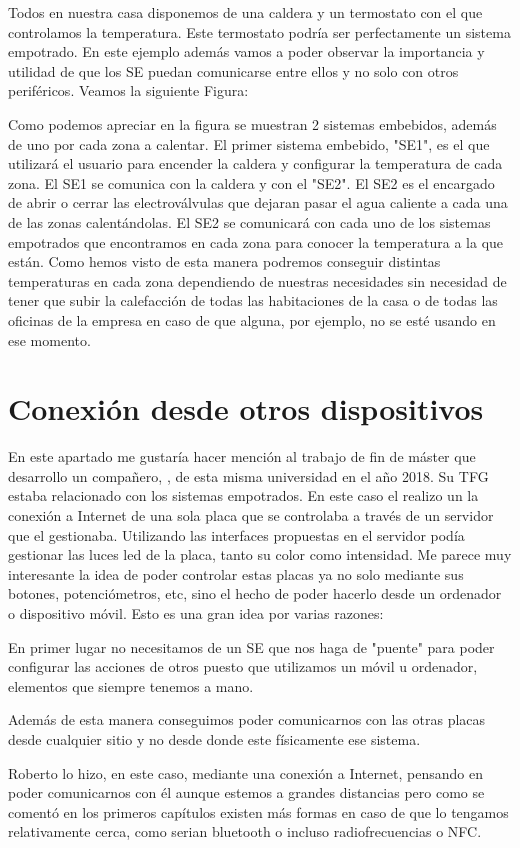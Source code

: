 Todos en nuestra casa disponemos de una caldera y un termostato con el que controlamos la temperatura. Este termostato podría ser perfectamente un sistema empotrado. En este ejemplo además vamos a poder observar la importancia y utilidad de que los SE puedan comunicarse entre ellos y no solo con otros periféricos. Veamos la siguiente Figura:


Como podemos apreciar en la figura se muestran 2 sistemas embebidos, además de uno por cada zona a calentar. El primer sistema embebido, "SE1", es el que utilizará el usuario para encender la caldera y configurar la temperatura de cada zona. El SE1 se comunica con la caldera y con el "SE2". El SE2 es el encargado de abrir o cerrar las electroválvulas que dejaran pasar el agua caliente a cada una de las zonas calentándolas. El SE2 se comunicará con cada uno de los sistemas empotrados que encontramos en cada zona para conocer la temperatura a la que están. 
Como hemos visto de esta manera podremos conseguir distintas temperaturas en cada zona dependiendo de nuestras necesidades sin necesidad de tener que subir la calefacción de todas las habitaciones de la casa o de todas las oficinas de la empresa en caso de que alguna, por ejemplo, no se esté usando en ese momento.

\section{Conexión desde otros dispositivos}\label{sec:TRConexiones}
En este apartado me gustaría hacer mención al trabajo de fin de máster que desarrollo un compañero, \cite{RPC0027}
, de esta misma universidad en el año 2018. Su TFG estaba relacionado con los sistemas empotrados. En este caso el realizo un la conexión a Internet de una sola placa que se controlaba a través de un servidor que el gestionaba. Utilizando las interfaces propuestas en el servidor podía gestionar las luces led de la placa, tanto su color como intensidad. Me parece muy interesante la idea de poder controlar estas placas ya no solo mediante sus botones, potenciómetros, etc, sino el hecho de poder hacerlo desde un ordenador o dispositivo móvil. Esto es una gran idea por varias razones:
\begin{description}
\item En primer lugar no necesitamos de un SE que nos haga de "puente" para poder configurar las acciones de otros puesto que utilizamos un móvil u ordenador, elementos que siempre tenemos a mano. 
\item Además de esta manera conseguimos poder comunicarnos con las otras placas desde cualquier sitio y no desde donde este físicamente ese sistema.
\end{description}
Roberto lo hizo, en este caso, mediante una conexión a Internet, pensando en poder comunicarnos con él aunque estemos a grandes distancias pero como se comentó en los primeros capítulos existen más formas en caso de que lo tengamos relativamente cerca, como serian bluetooth o incluso radiofrecuencias o NFC.


